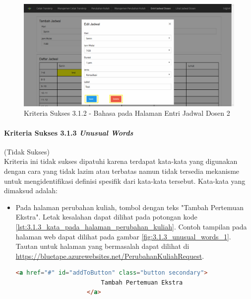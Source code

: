 \documentclass[a4paper,twoside]{article}
\begin{document}
\begin{enumerate}
\begin{itemize}
			\begin{figure}[H]
				\centering  
				\includegraphics[scale=0.3, frame]{kriteria-sukses-3-1-2-language-of-parts-3}  
				\caption[Kriteria Sukses 3.1.2 - Bahasa pada Halaman Entri Jadwal Dosen 2]{Kriteria Sukses 3.1.2 - Bahasa pada Halaman Entri Jadwal Dosen 2}
				\label{fig:3.1.2_language_of_parts_3}  
			\end{figure}
		\end{itemize}

		\paragraph{Kriteria Sukses 3.1.3 \textit{Unusual Words}}
		\label{par:kepatuhan_bluetape_kriteria_sukses_3.1.3}
		(Tidak Sukses)\\

		Kriteria ini tidak sukses dipatuhi karena terdapat kata-kata yang digunakan dengan cara yang tidak lazim atau terbatas namun tidak tersedia mekanisme untuk mengidentifikasi definisi spesifik dari kata-kata tersebut. Kata-kata yang dimaksud adalah:

		\begin{itemize}
			\item Pada halaman perubahan kuliah, tombol dengan teks "Tambah Pertemuan Ekstra". Letak kesalahan dapat dilihat pada potongan kode \ref{lst:3.1.3_kata_pada_halaman_perubahan_kuliah}. Contoh tampilan pada halaman web dapat dilihat pada gambar \ref{fig:3.1.3_unusual_words_1}. Tautan untuk halaman yang bermasalah dapat dilihat di \url{https://bluetape.azurewebsites.net/PerubahanKuliahRequest}.
			\begin{lstlisting}[frame=single, label={lst:3.1.3_kata_pada_halaman_perubahan_kuliah}, language=HTML, caption=Kriteria Sukses 3.1.3 - Kata yang Tak Lazim pada Halaman Perubahan Kuliah]
					<a href="#" id="addToButton" class="button secondary">
						Tambah Pertemuan Ekstra
					</a>
			\end{lstlisting}
			

\end{itemize}
\end{enumerate}
\end{document}
